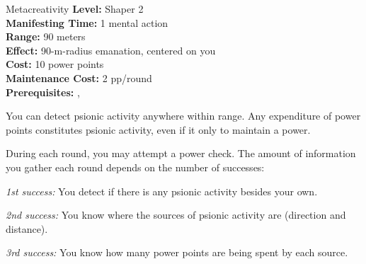 {Metacreativity}
{
	\textbf{Level:}
	Shaper 2\\
	\textbf{Manifesting Time:}
	1 mental action\\
	\textbf{Range:}
	90 meters\\
	\textbf{Effect:}
	90-m-radius emanation, centered on you\\
	\textbf{Cost:}
	10 power points\\
	\textbf{Maintenance Cost:}
	2 pp/round\\
	\textbf{Prerequisites:}
	, \\
}
{
	You can detect psionic activity anywhere within range. Any expenditure of power points constitutes psionic activity, even if it only to maintain a power.

	During each round, you may attempt a power check. The amount of information you gather each round depends on the number of successes:

	\textit{1st success:} You detect if there is any psionic activity besides your own.

	\textit{2nd success:} You know where the sources of psionic activity are (direction and distance).

	\textit{3rd success:} You know how many power points are being spent by each source.
}